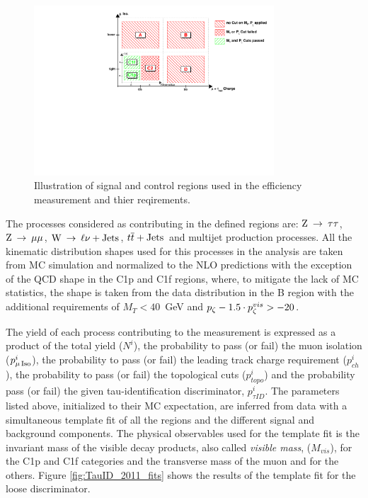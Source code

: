 \begin{figure}
\begin{center}
\includegraphics[angle=-0,width=0.8\textwidth]{3_Evt_Reconstruction/pics/figTauIdEffIllustration.pdf}
\caption{Illustration of signal and control regions used in the efficiency measurement and thier reqirements.
\label{fig:tau_eff_ABCD}
}
\end{center}
\end{figure}

The processes considered as contributing in the defined regions are: $\mathrm{Z}\:\rightarrow\:\tau\tau$, $\mathrm{Z}\:\rightarrow\:\mu\mu$, $\mathrm{W}\:\rightarrow\:\ell\nu+\rm{Jets}$, $t\overline{t}+\rm{Jets}$\ and multijet production processes. All the kinematic distribution shapes used for this processes in the analysis are taken from MC simulation and normalized to the NLO predictions with the exception of the QCD shape in the C1p and C1f regions, where, to mitigate the lack of MC statistics, the shape is taken from the data distribution in the B region with the additional requirements of $M_T < 40$\ GeV and $p_\zeta -1.5 \cdot p_\zeta^{vis} > -20$. 

The yield of each process contributing to the measurement is expressed as a product of the total yield ($N^i$), the probability to pass (or fail) the muon isolation ($p_{\mu\,\rm{Iso}}^i$), the probability to pass (or fail) the leading track charge requirement ($p_{ch}^i$), the probability to pass (or fail) the topological cuts ($p_{topo}^i$) and the probability pass (or fail) the given tau-identification discriminator, $p_{\tau ID}^i$. The parameters listed above, initialized to their MC expectation, are inferred from data with a simultaneous template fit of all the regions and the different signal and background components. The physical observables used for the template fit is the invariant mass of the visible decay products, also called \emph{visible mass}, ($M_{vis}$), for the C1p and C1f categories and the transverse mass of the muon and \MET for the others. Figure \ref{fig:TauID_2011_fits} shows the results of the template fit for the loose discriminator.

